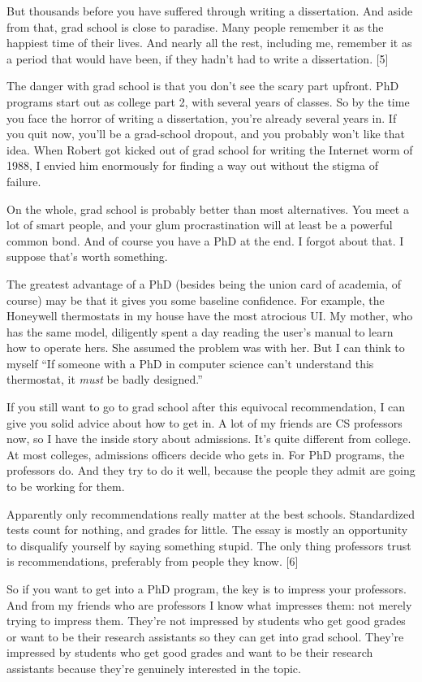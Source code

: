 But thousands before you have suffered through writing a dissertation.
And aside from that, grad school is close to paradise. Many people
remember it as the happiest time of their lives. And nearly all the
rest, including me, remember it as a period that would have been, if
they hadn't had to write a dissertation. {[}5{]}

The danger with grad school is that you don't see the scary part
upfront. PhD programs start out as college part 2, with several years of
classes. So by the time you face the horror of writing a dissertation,
you're already several years in. If you quit now, you'll be a
grad-school dropout, and you probably won't like that idea. When Robert
got kicked out of grad school for writing the Internet worm of 1988, I
envied him enormously for finding a way out without the stigma of
failure.

On the whole, grad school is probably better than most alternatives. You
meet a lot of smart people, and your glum procrastination will at least
be a powerful common bond. And of course you have a PhD at the end. I
forgot about that. I suppose that's worth something.

The greatest advantage of a PhD (besides being the union card of
academia, of course) may be that it gives you some baseline confidence.
For example, the Honeywell thermostats in my house have the most
atrocious UI. My mother, who has the same model, diligently spent a day
reading the user's manual to learn how to operate hers. She assumed the
problem was with her. But I can think to myself ``If someone with a PhD
in computer science can't understand this thermostat, it \emph{must} be
badly designed.''

If you still want to go to grad school after this equivocal
recommendation, I can give you solid advice about how to get in. A lot
of my friends are CS professors now, so I have the inside story about
admissions. It's quite different from college. At most colleges,
admissions officers decide who gets in. For PhD programs, the professors
do. And they try to do it well, because the people they admit are going
to be working for them.

Apparently only recommendations really matter at the best schools.
Standardized tests count for nothing, and grades for little. The essay
is mostly an opportunity to disqualify yourself by saying something
stupid. The only thing professors trust is recommendations, preferably
from people they know. {[}6{]}

So if you want to get into a PhD program, the key is to impress your
professors. And from my friends who are professors I know what impresses
them: not merely trying to impress them. They're not impressed by
students who get good grades or want to be their research assistants so
they can get into grad school. They're impressed by students who get
good grades and want to be their research assistants because they're
genuinely interested in the topic.

